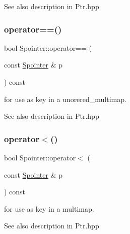 \begin{DoxySeeAlso}{See also}
description in Ptr.\+hpp 
\end{DoxySeeAlso}
\mbox{\label{group__table_gacb9d4d8e3da8a1e082b80fd31abb9772}} 
\subsubsection{\texorpdfstring{operator==()}{operator==()}\hspace{0.1cm}{\footnotesize\ttfamily [1/5]}}
{\footnotesize\ttfamily bool Spointer\+::operator== (\begin{DoxyParamCaption}\item[{const \mbox{\hyperlink{classSpointer}{Spointer}} \&}]{p }\end{DoxyParamCaption}) const\hspace{0.3cm}{\ttfamily [virtual]}}



for use as key in a unorered\+\_\+multimap. 

\begin{DoxySeeAlso}{See also}
description in Ptr.\+hpp 
\end{DoxySeeAlso}
\mbox{\label{group__table_ga797b376c9ed1b4777ea94ff8350c65c8}} 
\subsubsection{\texorpdfstring{operator$<$()}{operator<()}\hspace{0.1cm}{\footnotesize\ttfamily [1/3]}}
{\footnotesize\ttfamily bool Spointer\+::operator$<$ (\begin{DoxyParamCaption}\item[{const \mbox{\hyperlink{classSpointer}{Spointer}} \&}]{p }\end{DoxyParamCaption}) const\hspace{0.3cm}{\ttfamily [virtual]}}



for use as key in a multimap. 

\begin{DoxySeeAlso}{See also}
description in Ptr.\+hpp 
\end{DoxySeeAlso}
\mbox{\label{group__table_ga718cc6f7473c3fb1b074211bf2f16d8b}} 
